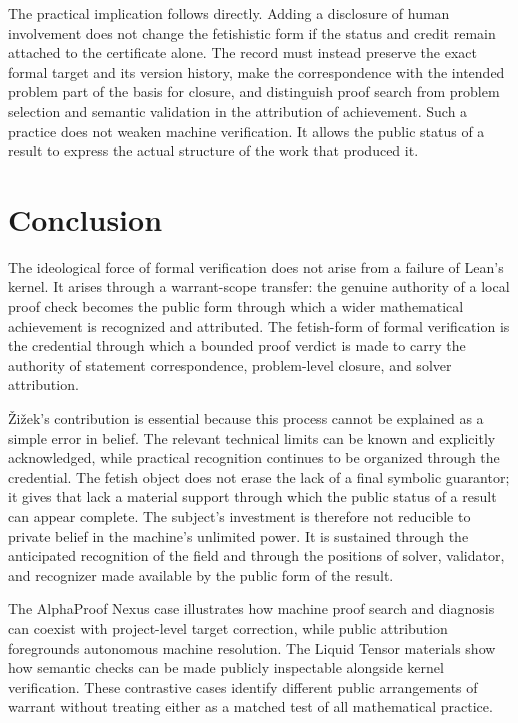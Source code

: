 \documentclass[pdflatex,sn-apa]{sn-jnl}
\begin{document}
The practical implication follows directly. Adding a disclosure of human involvement does not change the fetishistic form if the status and credit remain attached to the certificate alone. The record must instead preserve the exact formal target and its version history, make the correspondence with the intended problem part of the basis for closure, and distinguish proof search from problem selection and semantic validation in the attribution of achievement. Such a practice does not weaken machine verification. It allows the public status of a result to express the actual structure of the work that produced it.
\section{Conclusion}

The ideological force of formal verification does not arise from a failure of Lean's kernel. It arises through a warrant-scope transfer: the genuine authority of a local proof check becomes the public form through which a wider mathematical achievement is recognized and attributed. The fetish-form of formal verification is the credential through which a bounded proof verdict is made to carry the authority of statement correspondence, problem-level closure, and solver attribution.

Žižek's contribution is essential because this process cannot be explained as a simple error in belief. The relevant technical limits can be known and explicitly acknowledged, while practical recognition continues to be organized through the credential. The fetish object does not erase the lack of a final symbolic guarantor; it gives that lack a material support through which the public status of a result can appear complete. The subject's investment is therefore not reducible to private belief in the machine's unlimited power. It is sustained through the anticipated recognition of the field and through the positions of solver, validator, and recognizer made available by the public form of the result.

The AlphaProof Nexus case illustrates how machine proof search and diagnosis can coexist with project-level target correction, while public attribution foregrounds autonomous machine resolution. The Liquid Tensor materials show how semantic checks can be made publicly inspectable alongside kernel verification. These contrastive cases identify different public arrangements of warrant without treating either as a matched test of all mathematical practice.
\end{document}
